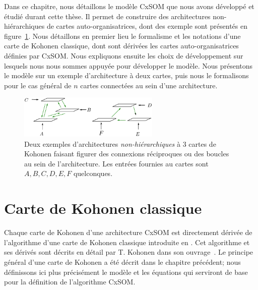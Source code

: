 \documentclass[../main]{subfiles}
\begin{document}
Dans ce chapitre, nous détaillons le modèle CxSOM que nous avons développé et étudié durant cette thèse. Il permet de construire des architectures non-hiérarchiques de cartes auto-organisatrices, dont des exemple sont présentés en figure~\ref{fig:archi_non_hierarchique}.
Nous détaillons en premier lieu le formalisme et les notations d'une carte de Kohonen classique, dont sont dérivées les cartes auto-organisatrices définies par CxSOM. 
Nous expliquons ensuite les choix de développement sur lesquels nous nous sommes appuyée pour développer le modèle. Nous présentons le modèle sur un exemple d'architecture à deux cartes, puis nous le formalisons pour le cas général de $n$ cartes connectées au sein d'une architecture.

\begin{figure}
\centering
\includegraphics[width=0.6\textwidth]{architecture.pdf}
\caption{Deux exemples d'architectures \emph{non-hiérarchiques} à 3 cartes de Kohonen faisant figurer des connexions réciproques ou des boucles au sein de l'architecture.
Les entrées fournies au cartes sont $A,B,C,D,E,F$ quelconques.}
\label{fig:archi_non_hierarchique}
\end{figure}


\section{Carte de Kohonen classique}\label{sec:kohonen}

Chaque carte de Kohonen d'une architecture CxSOM est directement dérivée de l'algorithme d'une carte de Kohonen classique introduite en \cite{Kohonen1982}. Cet algorithme et ses dérivés sont décrits en détail par T. Kohonen dans son ouvrage~\parencite{Kohonen1995SelfOrganizingM}. Le principe général d'une carte de Kohonen a été décrit dans le chapitre précédent; nous définissons ici plus précisément le modèle et les équations qui serviront de base pour la définition de l'algorithme CxSOM.
\end{document}

